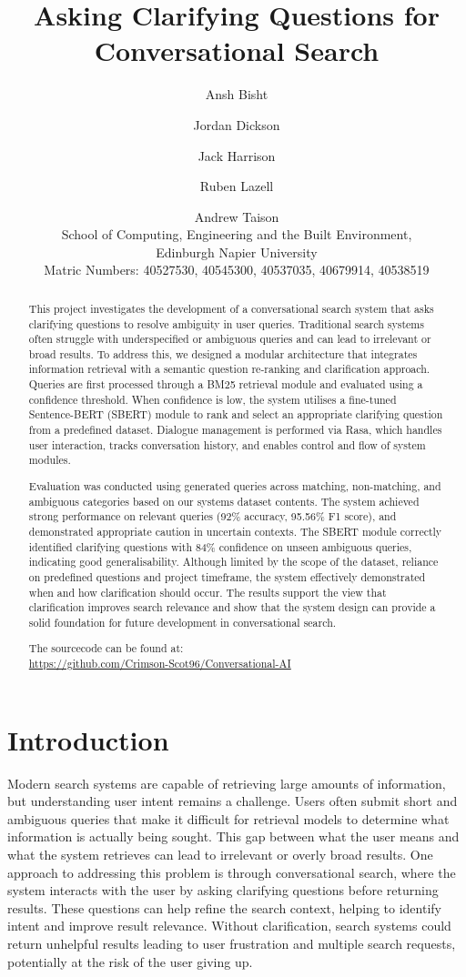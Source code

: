 \documentclass[11pt]{article}
\title{Asking Clarifying Questions for Conversational Search}
\author{
  Ansh Bisht \and
  Jordan Dickson \and
  Jack Harrison \and
  Ruben Lazell \and
  Andrew Taison  \\
  School of Computing, Engineering and the Built Environment, \\
  Edinburgh Napier University \\
  Matric Numbers: 40527530, 40545300, 40537035, 40679914, 40538519
}
\begin{document}
\maketitle
\begin{abstract}
  This project investigates the development of a conversational search system that asks clarifying questions to resolve ambiguity in user queries. Traditional search systems often struggle with underspecified or ambiguous queries and can lead to irrelevant or broad results. To address this, we designed a modular architecture that integrates information retrieval with a semantic question re-ranking and clarification approach. Queries are first processed through a BM25 retrieval module and evaluated using a confidence threshold. When confidence is low, the system utilises a fine-tuned Sentence-BERT (SBERT) module to rank and select an appropriate clarifying question from a predefined dataset. Dialogue management is performed via Rasa, which handles user interaction, tracks conversation history, and enables control and flow of system modules.

  Evaluation was conducted using generated queries across matching, non-matching, and ambiguous categories based on our systems dataset contents. The system achieved strong performance on relevant queries (92\% accuracy, 95.56\% F1 score), and demonstrated appropriate caution in uncertain contexts. The SBERT module correctly identified clarifying questions with 84\% confidence on unseen ambiguous queries, indicating good generalisability. Although limited by the scope of the dataset, reliance on predefined questions and project timeframe, the system effectively demonstrated when and how clarification should occur. The results support the view that clarification improves search relevance and show that the system design can provide a solid foundation for future development in conversational search.

  The sourcecode can be found at: \\
  \href{https://github.com/Crimson-Scot96/Conversational-AI}{https://github.com/Crimson-Scot96/Conversational-AI}
  
\end{abstract}


\section{Introduction}
Modern search systems are capable of retrieving large amounts of information, but understanding user intent remains a challenge. Users often submit short and ambiguous queries that make it difficult for retrieval models to determine what information is actually being sought. This gap between what the user means and what the system retrieves can lead to irrelevant or overly broad results. One approach to addressing this problem is through conversational search, where the system interacts with the user by asking clarifying questions before returning results. These questions can help refine the search context, helping to identify intent and improve result relevance. Without clarification, search systems could return unhelpful results leading to user frustration and multiple search requests, potentially at the risk of the user giving up.
\end{document}
